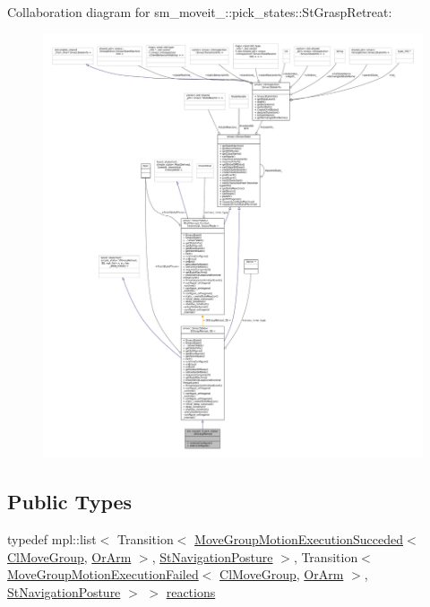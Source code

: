 Collaboration diagram for sm\+\_\+moveit\+\_\+:\+:pick\+\_\+states\+:\+:St\+Grasp\+Retreat\+:
\nopagebreak
\begin{figure}[H]
\begin{center}
\leavevmode
\includegraphics[width=350pt]{structsm__moveit__3_1_1pick__states_1_1StGraspRetreat__coll__graph}
\end{center}
\end{figure}
\subsection*{Public Types}
\begin{DoxyCompactItemize}
\item 
typedef mpl\+::list$<$ Transition$<$ \hyperlink{structmove__group__interface__client_1_1MoveGroupMotionExecutionSucceded}{Move\+Group\+Motion\+Execution\+Succeded}$<$ \hyperlink{classmove__group__interface__client_1_1ClMoveGroup}{Cl\+Move\+Group}, \hyperlink{classsm__moveit__3_1_1OrArm}{Or\+Arm} $>$, \hyperlink{structsm__moveit__3_1_1pick__states_1_1StNavigationPosture}{St\+Navigation\+Posture} $>$, Transition$<$ \hyperlink{structmove__group__interface__client_1_1MoveGroupMotionExecutionFailed}{Move\+Group\+Motion\+Execution\+Failed}$<$ \hyperlink{classmove__group__interface__client_1_1ClMoveGroup}{Cl\+Move\+Group}, \hyperlink{classsm__moveit__3_1_1OrArm}{Or\+Arm} $>$, \hyperlink{structsm__moveit__3_1_1pick__states_1_1StNavigationPosture}{St\+Navigation\+Posture} $>$ $>$ \hyperlink{structsm__moveit__3_1_1pick__states_1_1StGraspRetreat_a70e669ca561b239f068933599e982023}{reactions}
\end{DoxyCompactItemize}
